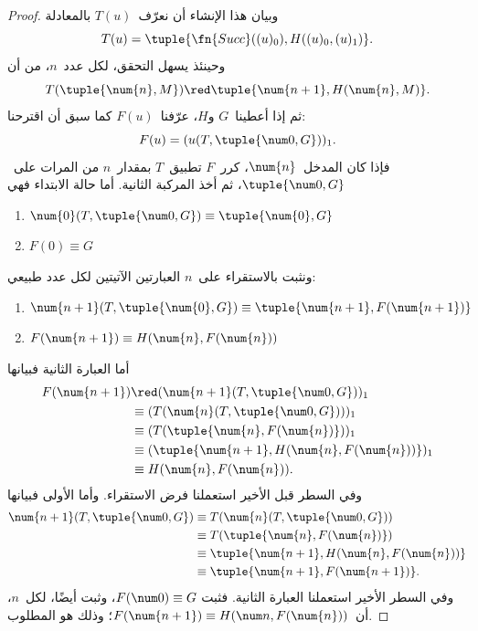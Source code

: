 \documentclass[../../../include/open-logic-section]{subfiles}
\begin{document}
\begin{proof}
وبيان هذا الإنشاء أن نعرّف~$T(u)$ بالمعادلة
\[
T(u) = \tuple{\fn{Succ}((u)_0), H((u)_0,(u)_1)}.
\]
وحينئذ يسهل التحقق، لكل عدد~$n$، من أن
\[
T(\tuple{\num{n}, M}) \red \tuple{\num{n+1}, H(\num{n}, M)}.
\]
ثم إذا أعطينا~$G$ و$H$، عرّفنا~$F(u)$ كما سبق أن اقترحنا:
\[
F(u) = (u(T,\tuple{\num 0, G}))_1.
\]
فإذا كان المدخل~$\num{n}$، كرر~$F$ تطبيق~$T$ بمقدار~$n$ من المرات
على~$\tuple{\num 0, G}$، ثم أخذ المركبة الثانية. أما حالة الابتداء فهي
\begin{enumerate}
\item $\num{0} (T, \tuple{\num 0, G}) \equiv \tuple{\num{0}, G}$
\item $F(\num{0}) \equiv G$
\end{enumerate}
ونثبت بالاستقراء على~$n$ العبارتين الآتيتين لكل عدد طبيعي:
\begin{enumerate}
\item $\num{n+1}(T, \tuple{\num{0}, G}) \equiv \tuple{\num{n+1}, F(\num{n+1})}$
\item $F(\num{n+1}) \equiv H(\num{n}, F(\num{n}))$
\end{enumerate}
أما العبارة الثانية فبيانها
\begin{align*}
F(\num{n+1}) & \red (\num{n+1}(T, \tuple{\num 0, G}))_1 \\
& \equiv (T(\num{n} (T, \tuple{\num 0, G})))_1 \\
& \equiv (T(\tuple{\num{n}, F(\num{n})}))_1 \\
& \equiv (\tuple{\num{n+1}, H(\num{n}, F(\num{n}))})_1 \\
& \equiv H(\num{n}, F(\num{n})).
\end{align*}
وفي السطر قبل الأخير استعملنا فرض الاستقراء. وأما الأولى فبيانها
\begin{align*}
\num{n+1} (T, \tuple{\num 0, G}) &
\equiv T(\num{n} (T, \tuple{\num 0, G})) \\
& \equiv T( \tuple{\num{n}, F(\num{n})}) \\
& \equiv \tuple{\num{n+1}, H(\num{n}, F(\num{n}))} \\
& \equiv \tuple{\num{n+1}, F(\num{n+1})}.
\end{align*}
وفي السطر الأخير استعملنا العبارة الثانية. فثبت
$F(\num 0) \equiv G$، وثبت أيضًا، لكل~$n$، أن~$F(\num {n+1}) \equiv H(\num n,
F(\num{n}))$؛ وذلك هو المطلوب.
\end{proof}
\end{document}
